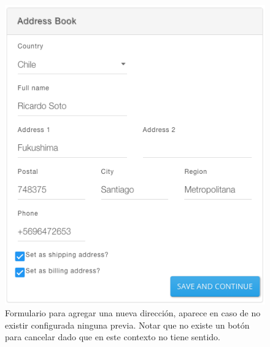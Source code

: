 		\begin{figure}[h!]
			\centering
			\includegraphics[width=1\textwidth]{figuras/address/form/add_first_address.png}
			\caption{Formulario para agregar una nueva dirección, aparece en caso de no existir configurada ninguna previa. Notar que no existe un botón para cancelar dado que en este contexto no tiene sentido.}
			\label{figure:address:form:add_first_address}
		\end{figure}




